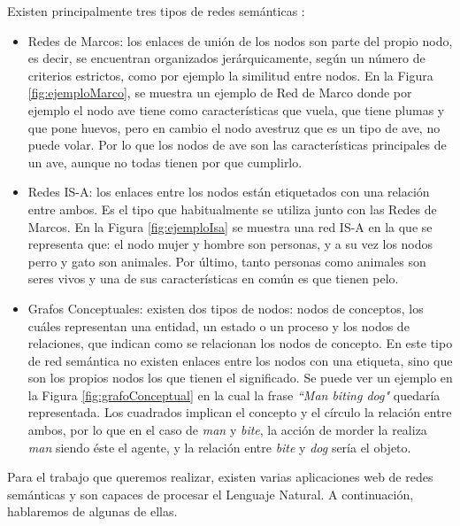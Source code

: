 Existen principalmente tres tipos de redes semánticas \citep{tiposRedesSemanticas}:
\begin{itemize}
	\item Redes de Marcos: los enlaces de unión de los nodos son parte del propio nodo, es decir, se encuentran organizados jerárquicamente, según un número de criterios estrictos, como por ejemplo la similitud entre nodos. En la Figura \ref{fig:ejemploMarco}, se muestra un ejemplo de Red de Marco donde por ejemplo el nodo ave tiene como características  que vuela, que tiene plumas y que pone huevos, pero en cambio el nodo avestruz que es un tipo de ave, no puede volar. Por lo que los nodos de ave son las características principales de un ave, aunque no todas tienen por que cumplirlo.
	\item Redes IS-A: los enlaces entre los nodos están etiquetados con una relación entre ambos. Es el tipo que habitualmente se utiliza junto con las Redes de Marcos. En la Figura \ref{fig:ejemploIsa} se muestra una red IS-A en la que se representa que: el nodo mujer y hombre son personas, y a su vez los nodos perro y gato son animales. Por último, tanto personas como animales son seres vivos y una de sus características en común es que tienen pelo.
	\item Grafos Conceptuales: existen dos tipos de nodos: nodos de conceptos, los cuáles representan una entidad, un estado o un proceso y los nodos de relaciones, que indican como se relacionan los nodos de concepto. En este tipo de red semántica no existen enlaces entre los nodos con una etiqueta, sino que son los propios nodos los que tienen el significado. Se puede ver un ejemplo en la Figura \ref{fig:grafoConceptual} \citep{osti_5673179} en la cual la frase \textit{``Man biting dog"} quedaría representada. Los cuadrados implican el concepto y el círculo la relación entre ambos, por lo que en el caso de \textit{man} y \textit{bite}, la acción de morder la realiza \textit{man} siendo éste el agente, y la relación entre \textit{bite} y \textit{dog} sería el objeto.
\end{itemize}
Para el trabajo que queremos realizar, existen varias aplicaciones web de redes semánticas y son capaces de procesar el Lenguaje Natural.  A continuación, hablaremos de algunas de ellas.

